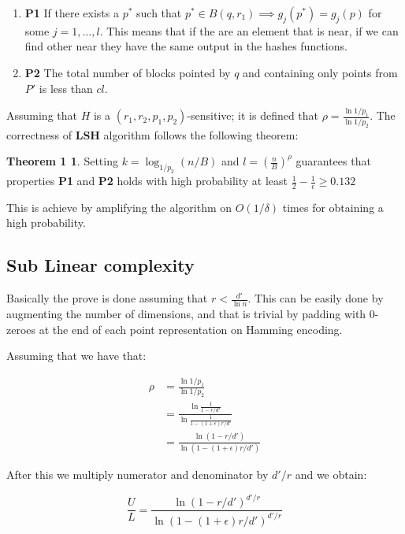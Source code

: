 \documentclass[12pt, a4paper]{article}
\theoremstyle{definition}
\begin{document}
\begin{enumerate}
 \item \textbf{P1} If there exists a $p^*$ such that $p^* \in B(q, r_1) \implies g_j(p^*) = g_j(p)$ for some $j = 1, \dots, l$. This means that if the are an element that is near, if we can find other near they have the same output in the hashes functions.
 \item \textbf{P2} The total number of blocks pointed by $q$ and containing only points from $P'$ is less than $cl$.
\end{enumerate}

Assuming that $H$ is a $(r_1, r_2, p_1, p_2)$-sensitive; it is defined that $\rho = \frac{\ln{1/p_1}}{\ln{1/p_2}}$. The correctness of \textbf{LSH} algorithm follows the following theorem:

\newtheorem{high}{Theorem 1}
\begin{high}
  Setting $k = \log_{1/p_2}(n/B)$ and $l = (\frac{n}{B})^\rho$ guarantees that properties \textbf{P1} and \textbf{P2} holds with high probability at least $\frac{1}{2} - \frac{1}{\epsilon} \geq 0.132$
\end{high}

This is achieve by amplifying the algorithm on $O(1/\delta)$ times for obtaining a high probability.

\subsection{Sub Linear complexity}
Basically the prove is done assuming that $r < \frac{d'}{\ln{n}}$. This can be easily done by augmenting the number of dimensions, and that is trivial by padding with $0$-zeroes at the end of each point representation on Hamming encoding.

Assuming that we have that:

\begin{subequations}
  \begin{align}
  \rho &= \frac{\ln{1/p_1}}{\ln{1/p_2}} \\
       &= \frac{\ln{\frac{1}{1-r/{d'}}}}{\ln{\frac{1}{1-(1+\epsilon)r/{d'}}}} \\
       &= \frac{\ln{(1-r/{d'})}}{\ln{(1-(1+\epsilon)r/{d'})}}
  \end{align}
\end{subequations}

After this we multiply numerator and denominator by $d'/r$ and we obtain:

\begin{equation*}
  \frac{U}{L} = \frac{\ln{(1-r/{d'})^{d'/r}}}{\ln{(1-(1+\epsilon)r/{d'})^{d'/r}}}
\end{equation*}
\end{document}
